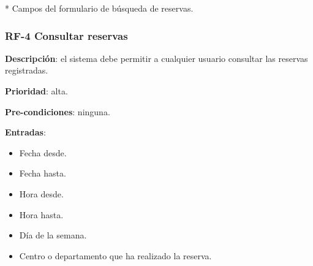 * Campos del formulario de búsqueda de reservas.

\subsubsection{RF-4 Consultar reservas}

\textbf{Descripción}: el sistema debe permitir a cualquier usuario consultar las reservas registradas.

\textbf{Prioridad}: alta.

\textbf{Pre-condiciones}: ninguna.

\textbf{Entradas}:
    \begin{itemize}
    \tightlist
        \item Fecha desde.
        \item Fecha hasta.
        \item Hora desde.
        \item Hora hasta.
        \item Día de la semana.
        \item Centro o departamento que ha realizado la reserva.
    \end{itemize}

